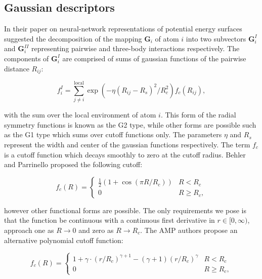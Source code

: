 \subsection{Gaussian descriptors}\label{chap:gaussian}
In their paper on neural-network representations of
potential energy surfaces \parencite[Behler, J\"{o}rg and
Parrinello, Michele]{behler2007generalized}
suggested the decomposition of the mapping $\bm{G}_i$ of atom $i$
into two subvectors $\bm{G}_i^I$ and $\bm{G}_i^{II}$ representing
pairwise and three-body interactions respectively.
The components of $\bm{G}_i^I$ are comprised of
sums of gaussian functions of the pairwise distance $R_{ij}$:

\begin{equation}
 f_i^I = \sum_{j \neq i}^{\text{local}}
    \exp \left( -\eta(R_{ij} - R_s)^2 / R_c^2 \right) f_c (R_{ij}) , 
\end{equation}

with the sum over the local environment of atom $i$.
This form of the radial symmetry functions is known as the G2 type,
while other forms are possible such as the G1 type which sums over
cutoff functions only.
The parameters $\eta$ and $R_s$ represent the width and center
of the gaussian functions respectively. The term $f_c$
is a cutoff function which decays smoothly to zero
at the cutoff radius. Behler and Parrinello proposed
the following cutoff:

\begin{equation}
    f_c(R) =
\begin{cases}
    \frac{1}{2}\left(1 + \cos \left(\pi R / R_c \right) \right) & R < R_c \\
    0 & R \geq R_c ,
\end{cases}
\end{equation}

however other functional forms are possible.
The only requirements we pose
is that the function be continuous with a continuous first derivative
in $r \in [0, \infty)$,
approach one as $R \rightarrow 0$
and zero as $R \rightarrow R_c$.
The AMP authors propose an alternative polynomial cutoff function:

\begin{equation}
    f_c(R) =
\begin{cases}
    1 + \gamma \cdot (r / R_c)^{\gamma + 1} - (\gamma + 1)(r / R_c)^{\gamma} & R < R_c \\
    0 & R \geq R_c ,
\end{cases}
\end{equation}

